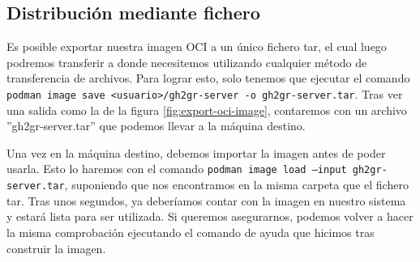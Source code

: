 \subsection{Distribución mediante fichero}
Es posible exportar nuestra imagen OCI a un único fichero tar, el cual luego podremos transferir a donde necesitemos utilizando cualquier método de transferencia de archivos. Para lograr esto, solo tenemos que ejecutar el comando \texttt{podman image save <usuario>/gh2gr-server -o gh2gr-server.tar}. Tras ver una salida como la de la figura \ref{fig:export-oci-image}, contaremos con un archivo ''gh2gr-server.tar'' que podemos llevar a la máquina destino.

Una vez en la máquina destino, debemos importar la imagen antes de poder usarla. Esto lo haremos con el comando \texttt{podman image load --input gh2gr-server.tar}, suponiendo que nos encontramos en la misma carpeta que el fichero tar. Tras unos segundos, ya deberíamos contar con la imagen en nuestro sistema y estará lista para ser utilizada. Si queremos asegurarnos, podemos volver a hacer la misma comprobación ejecutando el comando de ayuda que hicimos tras construir la imagen.

